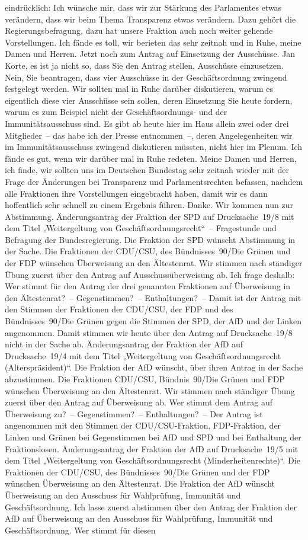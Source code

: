 \documentclass[10pt, a4paper]{report}
\begin{document}
eindrücklich: Ich wünsche mir, dass wir zur Stärkung des Parlamentes etwas verändern, dass wir beim Thema Transparenz etwas verändern. Dazu gehört die Regierungsbefragung, dazu hat unsere Fraktion auch noch weiter gehende Vorstellungen. Ich fände es toll, wir berieten das sehr zeitnah und in Ruhe, meine Damen und Herren. Jetzt noch zum Antrag auf Einsetzung der Ausschüsse. Jan Korte, es ist ja nicht so, dass Sie den Antrag stellen, Ausschüsse einzusetzen. Nein, Sie beantragen, dass vier Ausschüsse in der Geschäftsordnung zwingend festgelegt werden. Wir sollten mal in Ruhe darüber diskutieren, warum es eigentlich diese vier Ausschüsse sein sollen, deren Einsetzung Sie heute fordern, warum es zum Beispiel nicht der Geschäftsordnungs- und der Immunitätsausschuss sind. Es gibt ab heute hier im Haus allein zwei oder drei Mitglieder – das habe ich der Presse entnommen –, deren Angelegenheiten wir im Immunitätsausschuss zwingend diskutieren müssten, nicht hier im Plenum. Ich fände es gut, wenn wir darüber mal in Ruhe redeten. Meine Damen und Herren, ich finde, wir sollten uns im Deutschen Bundestag sehr zeitnah wieder mit der Frage der Änderungen bei Transparenz und Parlamentsrechten befassen, nachdem alle Fraktionen ihre Vorstellungen eingebracht haben, damit wir es dann hoffentlich sehr schnell zu einem Ergebnis führen. Danke. Wir kommen nun zur Abstimmung. Änderungsantrag der Fraktion der SPD auf Drucksache 19/8 mit dem Titel „Weitergeltung von Geschäftsordnungsrecht“ – Fragestunde und Befragung der Bundesregierung. Die Fraktion der SPD wünscht Abstimmung in der Sache. Die Fraktionen der CDU/CSU, des Bündnisses 90/Die Grünen und der FDP wünschen Überweisung an den Ältestenrat. Wir stimmen nach ständiger Übung zuerst über den Antrag auf Ausschussüberweisung ab. Ich frage deshalb: Wer stimmt für den Antrag der drei genannten Fraktionen auf Überweisung in den Ältestenrat? – Gegenstimmen? – Enthaltungen? – Damit ist der Antrag mit den Stimmen der Fraktionen der CDU/CSU, der FDP und des Bündnisses 90/Die Grünen gegen die Stimmen der SPD, der AfD und der Linken angenommen. Damit stimmen wir heute über den Antrag auf Drucksache 19/8 nicht in der Sache ab. Änderungsantrag der Fraktion der AfD auf Drucksache 19/4 mit dem Titel „Weitergeltung von Geschäftsordnungsrecht (Alterspräsident)“. Die Fraktion der AfD wünscht, über ihren Antrag in der Sache abzustimmen. Die Fraktionen CDU/CSU, Bündnis 90/Die Grünen und FDP wünschen Überweisung an den Ältestenrat. Wir stimmen nach ständiger Übung zuerst über den Antrag auf Überweisung ab. Wer stimmt dem Antrag auf Überweisung zu? – Gegenstimmen? – Enthaltungen? – Der Antrag ist angenommen mit den Stimmen der CDU/CSU-Fraktion, FDP-Fraktion, der Linken und Grünen bei Gegenstimmen bei AfD und SPD und bei Enthaltung der Fraktionslosen. Änderungsantrag der Fraktion der AfD auf Drucksache 19/5 mit dem Titel „Weitergeltung von Geschäftsordnungsrecht (Minderheitenrechte)“. Die Fraktionen der CDU/CSU, des Bündnisses 90/Die Grünen und der FDP wünschen Überweisung an den Ältestenrat. Die Fraktion der AfD wünscht Überweisung an den Ausschuss für Wahlprüfung, Immunität und Geschäftsordnung. Ich lasse zuerst abstimmen über den Antrag der Fraktion der AfD auf Überweisung an den Ausschuss für Wahlprüfung, Immunität und Geschäftsordnung. Wer stimmt für diesen 
\end{document}
